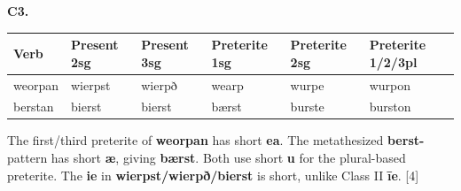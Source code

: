 \par\begin{minipage}{\linewidth}\raggedright
\textbf{C3.}

\par\begingroup
\fontsize{10.5}{13.2}\selectfont
\setlength{\LTleft}{0pt}\setlength{\LTright}{\fill}
\noindent
\begin{tabular}{@{}>{\raggedright\arraybackslash}p{17.12mm}>{\raggedright\arraybackslash}p{17.12mm}>{\raggedright\arraybackslash}p{17.12mm}>{\raggedright\arraybackslash}p{18.49mm}>{\raggedright\arraybackslash}p{18.49mm}>{\raggedright\arraybackslash}p{21.58mm}@{}}
\toprule
\textbf{Verb} & \textbf{Present 2sg} & \textbf{Present 3sg} & \textbf{Preterite 1sg} & \textbf{Preterite 2sg} & \textbf{Preterite 1/\allowbreak{}2/\allowbreak{}3pl} \\
\midrule
weorpan & wierpst & wierpð & wearp & wurpe & wurpon \\
berstan & bierst & bierst & bærst & burste & burston \\
\bottomrule
\end{tabular}
\par\endgroup

The first/\allowbreak{}third preterite of \textbf{weorpan} has short \textbf{ea}. The metathesized \textbf{berst-} pattern has short \textbf{æ}, giving \textbf{bærst}. Both use short \textbf{u} for the plural-based preterite. The \textbf{ie} in \textbf{wierpst/\allowbreak{}wierpð/\allowbreak{}bierst} is short, unlike Class II \textbf{īe}. [4]

\end{minipage}\par\addvspace{4pt}

